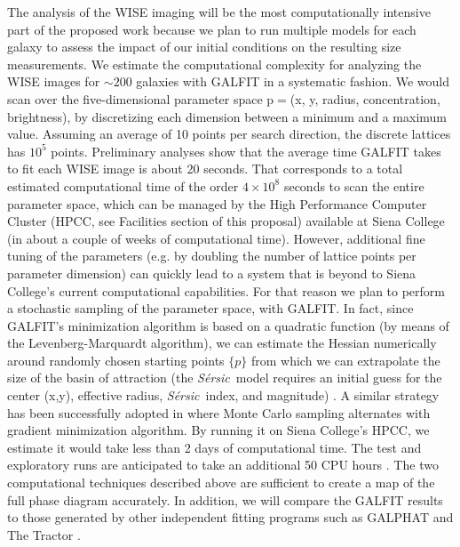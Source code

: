 \documentclass[11pt, preprint]{aastex}
\newcommand{\sers}{{\it S\'{e}rsic}}
\begin{document}
{The analysis of the WISE imaging will be the most computationally
intensive part of the proposed work because we plan to run multiple
models for each galaxy to assess the impact of our initial conditions
on the resulting size measurements.   We estimate the computational
complexity for analyzing the WISE images for $\sim 200$ galaxies with
GALFIT in a systematic fashion.  We would scan over the
five-dimensional parameter space p$=$(x, y, radius, concentration,
brightness), by discretizing each dimension between a minimum and a
maximum value. Assuming an average of 10 points per search direction,
the discrete lattices has $10^5$ points. Preliminary analyses show
that the average time GALFIT takes to fit each WISE image is about 20
seconds. That corresponds to a total estimated computational time of
the order $4 \times 10^{8}$ seconds to scan the entire parameter
space, which can be managed by the High Performance  Computer Cluster
(HPCC, see Facilities section of this proposal) available at Siena
College (in about a couple of weeks of computational time). However,
additional fine tuning of the parameters (e.g. by
doubling the number of lattice points per parameter dimension) can
quickly lead to a system that is beyond to Siena College’s current
computational capabilities.  For that reason we plan to perform a
stochastic sampling of the parameter space, with GALFIT.  In fact,
since GALFIT’s minimization algorithm is based on a quadratic function
(by means of the Levenberg-Marquardt algorithm), we can estimate the
Hessian numerically around randomly chosen starting points $\{p\}$
from which we can extrapolate the size of the basin of attraction (the
\sers \ model requires an initial guess for the center (x,y),
effective radius, \sers \ index, and magnitude) . A similar strategy
has been successfully adopted in \citep{pardo11} where Monte Carlo
sampling alternates with gradient minimization algorithm.  By running
it on Siena College’s HPCC, we estimate it would take less than 2 days
of computational time. The test and exploratory runs are anticipated
to take an additional 50 CPU hours \citep[for a recent application of
this method see,]{sala12}. The two computational techniques described
above are sufficient to create a map of the full phase diagram
accurately.  In addition, we will compare the GALFIT results to those
generated by other independent fitting programs such as  GALPHAT
\citep{yoon11} and The Tractor \citep{lang16}.





\vspace*{-1cm}
}
\end{document}
